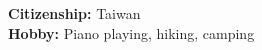\documentclass[A4,11pt]{article}
\makeatletter
\newcommand{\CVSubheading}[4]{
  \vspace{-2pt}\item
    \begin{tabular*}{0.97\textwidth}[t]{l@{\extracolsep{\fill}}r}
      \textbf{#1} & #2 \\
      \small#3 & \small #4 \\
    \end{tabular*}\vspace{-7pt}
}
\newcommand{\CVSubHeadingListStart}{\begin{itemize}[leftmargin=0.5cm, label={}]}
\newcommand{\CVSubHeadingListEnd}{\end{itemize}}
\makeatother
\begin{document}
\textbf{Citizenship:} Taiwan \\
\textbf{Hobby:} Piano playing, hiking, camping
  

    
\end{document}
